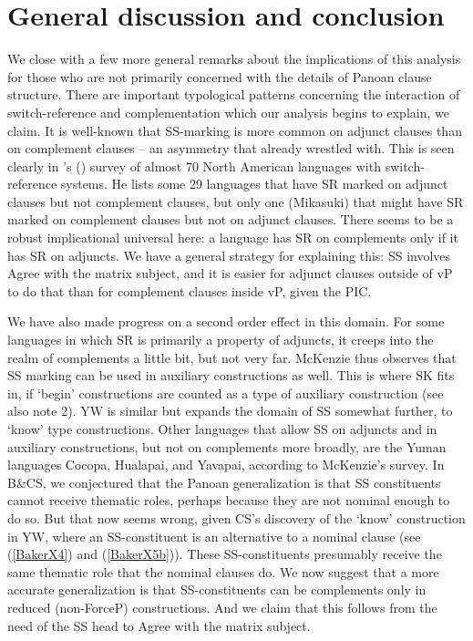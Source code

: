 \documentclass[output=paper]{langscibook}
\begin{document}
\section{General discussion and conclusion}\label{sec:baker:6}

We close with a few more general remarks about the implications of this analysis for those who are not primarily concerned with the details of Panoan clause structure. There are important typological patterns concerning the interaction of switch-ref\-er\-ence and complementation which our analysis begins to explain, we claim. It is well-known that SS-marking is more common on adjunct clauses than on complement clauses – an asymmetry that \citet{finer1984formal, finer1985syntax} already wrestled with. This is seen clearly in \citeauthor{mckenzie2015survey}’s (\citeyear{mckenzie2015survey}) survey of almost 70 North American languages with switch-ref\-er\-ence systems. He lists some 29 languages that have SR marked on adjunct clauses but not complement clauses, but only one (Mikasuki) that might have SR marked on complement clauses but not on adjunct clauses. There seems to be a robust implicational universal here: a language has SR on complements only if it has SR on adjuncts. We have a general strategy for explaining this: SS involves Agree with the matrix subject, and it is easier for adjunct clauses outside of vP to do that than for complement clauses inside vP, given the PIC.

We have also made progress on a second order effect in this domain. For some languages in which SR is primarily a property of adjuncts, it creeps into the realm of complements a little bit, but not very far. McKenzie thus observes that SS marking can be used in auxiliary constructions as well. This is where SK fits in, if ‘begin’ constructions are counted as a type of auxiliary construction (see also note 2). YW is similar but expands the domain of SS somewhat further, to ‘know’ type constructions. Other languages that allow SS on adjuncts and in auxiliary constructions, but not on complements more broadly, are the Yuman languages Cocopa, Hualapai, and Yavapai, according to McKenzie’s survey. In B\&CS, we conjectured that the Panoan generalization is that SS constituents cannot receive thematic roles, perhaps because they are not nominal enough to do so. But that now seems wrong, given CS’s discovery of the ‘know’ construction in YW, where an SS-constituent is an alternative to a nominal clause (see (\ref{BakerX4}) and (\ref{BakerX5b})). These SS-constituents presumably receive the same thematic role that the nominal clauses do. We now suggest that a more accurate generalization is that SS-constituents can be complements only in reduced (non-ForceP) constructions. And we claim that this follows from the need of the SS head to Agree with the matrix subject.
\end{document}
